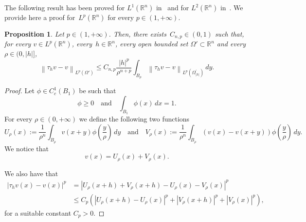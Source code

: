 \documentclass[12pt]{article}
\newcommand{\R}{\mathbb{R}}
\numberwithin{equation}{section}
\newtheorem{prop}[thm]{Proposition}
\renewcommand{\leq}{\leqslant}
\renewcommand{\geq}{\geqslant}
\begin{document}
\begin{appendix}
The following result has been proved for $L^1(\R^n)$ in~\cite{MR2765717} and for $L^2(\R^n)$ in~\cite{MR4544090}. We provide here a proof for~$L^p(\R^n)$ for every $p \in (1,+\infty)$. 

\begin{prop}\label{colieradgber}
Let $p\in (1,+\infty)$. Then, there exists~$C_{n,p}\in (0,1)$ such that, for every $v\in L^p(\R^n)$, every~$h\in \R^n$, every
open bounded set $\Omega' \subset\R^n$ and every~$\rho\in (0,\left|h\right|]$,
\begin{equation}\label{slogbfvdtre54}
\left\| \tau_h v-v   \right\|_{L^p(\Omega')}\leq C_{n,p}\frac{\left|h\right|^p}{\rho^{n+p}}\int_{B_\rho}\left\|\tau_h v-v\right\|_{L^p(\Omega_{\left|h\right|}^{'})}\,dy.
\end{equation}
\end{prop}



\begin{proof}
Let $\phi\in C_c^1(B_1)$ be such that 
\begin{equation*}
\phi\geq 0 \quad\mbox{and}\quad \int_{B_1}\phi(x)\,dx=1.
\end{equation*}
For every $\rho\in (0,+\infty)$ we define the following two functions 
\begin{equation*}
U_\rho(x):=\frac{1}{\rho^n}\int_{B_\rho}v(x+y)\phi\left(\frac{y}{\rho}\right)\,dy\quad\mbox{and}\quad V_\rho(x):=\frac{1}{\rho^n}\int_{B_\rho} (v(x)-v(x+y))\phi\left(\frac{y}{\rho}\right)\,dy.
\end{equation*}
We notice that 
\begin{equation*}
v(x)=U_\rho(x)+V_\rho(x).
\end{equation*}

We also have that
\begin{equation}\label{klorfecg}
\begin{split}
\left|\tau_h v(x)-v(x)\right|^p&=\left|U_\rho(x+h)+V_\rho(x+h)-U_\rho(x)-V_\rho(x)\right|^p\\
&\leq C_p\left(\left|U_\rho(x+h)-U_\rho(x)\right|^p+\left|V_\rho(x+h)\right|^p+\left|V_\rho(x)\right|^p\right),
\end{split}
\end{equation}
for a suitable constant $C_p>0$.


\end{proof}
\end{appendix}
\end{document}
